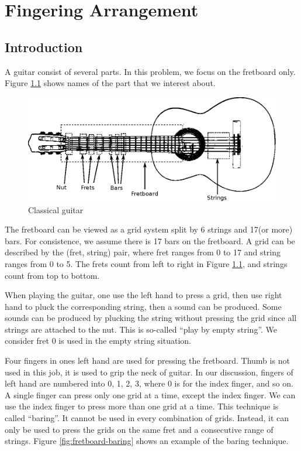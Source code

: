 \chapter{Fingering Arrangement}

\label{Chapter:Fingering-Arrangement}

\section{Introduction}
A guitar consist of several parts. In this problem, we focus on the fretboard only.
Figure \ref{fig:guitar} shows names of the part that we interest about.

\begin{figure}[h]
    \centering
    \includegraphics[width=\textwidth]{Figures/guitar.eps}
    \caption{Classical guitar}
    \label{fig:guitar}
\end{figure}

The fretboard can be viewed as a grid system split by 6 strings and 17(or more) bars. For consistence, we assume there is 17 bars on the fretboard. A grid can be described by the (fret, string) pair, where fret ranges from 0 to 17 and string ranges from 0 to 5. The frets count from left to right in Figure \ref{fig:guitar}, and strings count from top to bottom.

When playing the guitar, one use the left hand to press a grid, then use right hand to pluck the corresponding string, then a sound can be produced. Some sounds can be produced by plucking the string without pressing the grid since all strings are attached to the nut. This is so-called ``play by empty string''. We consider fret 0 is used in the empty string situation.

Four fingers in ones left hand are used for pressing the fretboard. Thumb is not used in this job, it is used to grip the neck of guitar. In our discussion, fingers of left hand are numbered into 0, 1, 2, 3, where 0 is for the index finger, and so on. A single finger can press only one grid at a time, except the index finger. We can use the index finger to press more than one grid at a time. This technique is called ``baring''. It cannot be used in every combination of grids. Instead, it can only be used to press the grids on the same fret and a consecutive range of strings. Figure \ref{fig:fretboard-baring} shows an example of the baring technique.

